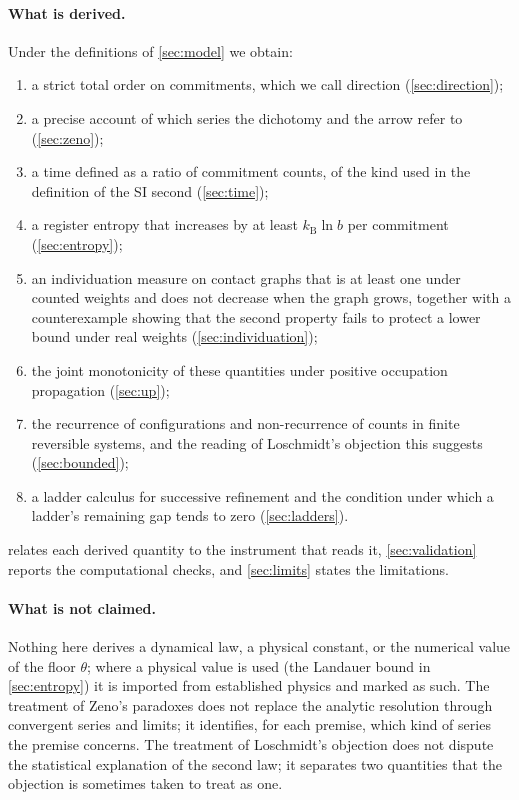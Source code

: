 \documentclass[10pt,twocolumn,a4paper]{article}
\newcommand{\kB}{k_{\mathrm{B}}}
\begin{document}
\paragraph{What is derived.}
Under the definitions of \cref{sec:model} we obtain:
\begin{enumerate}[label=(\roman*),nosep]
\item a strict total order on commitments, which we call direction
      (\cref{sec:direction});
\item a precise account of which series the dichotomy and the arrow refer to
      (\cref{sec:zeno});
\item a time defined as a ratio of commitment counts, of the kind used in
      the definition of the SI second (\cref{sec:time});
\item a register entropy that increases by at least $\kB\ln b$ per commitment
      (\cref{sec:entropy});
\item an individuation measure on contact graphs that is at least one under
      counted weights and does not decrease when the graph grows, together
      with a counterexample showing that the second property fails to
      protect a lower bound under real weights (\cref{sec:individuation});
\item the joint monotonicity of these quantities under positive occupation
      propagation (\cref{sec:up});
\item the recurrence of configurations and non-recurrence of counts in
      finite reversible systems, and the reading of Loschmidt's objection
      this suggests (\cref{sec:bounded});
\item a ladder calculus for successive refinement and the condition under
      which a ladder's remaining gap tends to zero (\cref{sec:ladders}).
\end{enumerate}
 relates each derived quantity to the instrument that
reads it, \cref{sec:validation} reports the computational checks, and
\cref{sec:limits} states the limitations.

\paragraph{What is not claimed.}
Nothing here derives a dynamical law, a physical constant, or the numerical
value of the floor $\theta$; where a physical value is used (the Landauer
bound in \cref{sec:entropy}) it is imported from established physics and
marked as such. The treatment of Zeno's paradoxes does not replace the
analytic resolution through convergent series and limits; it identifies, for
each premise, which kind of series the premise concerns. The treatment of
Loschmidt's objection does not dispute the statistical explanation of the
second law; it separates two quantities that the objection is sometimes taken
to treat as one.
\end{document}
